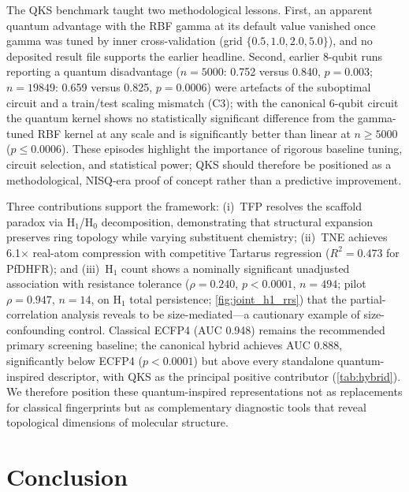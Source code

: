 \documentclass[11pt,a4paper]{article}
\begin{document}
The QKS benchmark taught two methodological lessons. First, an apparent quantum advantage with the RBF gamma at its default value vanished once gamma was tuned by inner cross-validation (grid $\{0.5, 1.0, 2.0, 5.0\}$), and no deposited result file supports the earlier headline. Second, earlier 8-qubit runs reporting a quantum disadvantage ($n = \num{5000}$: \num{0.752} versus \num{0.840}, $p = \num{0.003}$; $n = \num{19849}$: \num{0.659} versus \num{0.825}, $p = \num{0.0006}$) were artefacts of the suboptimal circuit and a train/test scaling mismatch (C3); with the canonical 6-qubit circuit the quantum kernel shows no statistically significant difference from the gamma-tuned RBF kernel at any scale and is significantly better than linear at $n \geq \num{5000}$ ($p \leq \num{0.0006}$). These episodes highlight the importance of rigorous baseline tuning, circuit selection, and statistical power; QKS should therefore be positioned as a methodological, NISQ-era proof of concept rather than a predictive improvement.

Three contributions support the framework: (i)~TFP resolves the scaffold paradox via H$_1$/H$_0$ decomposition, demonstrating that structural expansion preserves ring topology while varying substituent chemistry; (ii)~TNE achieves \num{6.1}$\times$ real-atom compression with competitive Tartarus regression ($R^2 = \num{0.473}$ for PfDHFR); and (iii)~H$_1$ count shows a nominally significant unadjusted association with resistance tolerance ($\rho = \num{0.240}$, $p < \num{0.0001}$, $n = \num{494}$; pilot $\rho = \num{0.947}$, $n = \num{14}$, on H$_1$ total persistence; \cref{fig:joint_h1_rrs}) that the partial-correlation analysis reveals to be size-mediated---a cautionary example of size-confounding control. Classical ECFP4 (AUC \num{0.948}) remains the recommended primary screening baseline; the canonical hybrid achieves AUC \num{0.888}, significantly below ECFP4 ($p < \num{0.0001}$) but above every standalone quantum-inspired descriptor, with QKS as the principal positive contributor (\cref{tab:hybrid}). We therefore position these quantum-inspired representations not as replacements for classical fingerprints but as complementary diagnostic tools that reveal topological dimensions of molecular structure.


\section{Conclusion}
\end{document}

